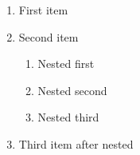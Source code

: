 \begin{enumerate}
\item First item
\item Second item
  \begin{enumerate}
  \item Nested first
  \item Nested second
  \item Nested third
  \end{enumerate}
\item Third item after nested
\end{enumerate}
